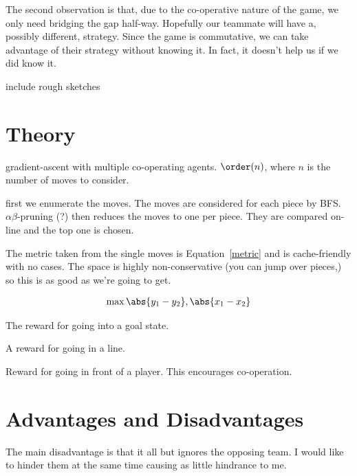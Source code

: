 \documentclass[twocolumn]{article}
\begin{document}
The second observation is that, due to the co-operative nature of the game, we only need bridging the gap half-way. Hopefully our teammate will have a, possibly different, strategy. Since the game is commutative, we can take advantage of their strategy without knowing it. In fact, it doesn't help us if we did know it.

include rough sketches

\section{Theory}


gradient-ascent with multiple co-operating agents.\cite{} $\order(n)$, where $n$ is the number of moves to consider.

first we enumerate the moves. The moves are considered for each piece by BFS. $\alpha\beta$-pruning (?) then reduces the moves to one per piece.\cite{} They are compared on-line and the top one is chosen.

The metric taken from the single moves is Equation~\ref{metric} and is cache-friendly with no cases. The space is highly non-conservative (you can jump over pieces,) so this is as good as we're going to get.

\begin{align}
\max{\abs{y_{1} - y_{2}}, \abs{x_{1} - x_{2}}}\label{metric}
\end{align}

The reward for going into a goal state.

A reward for going in a line.

Reward for going in front of a player. This encourages co-operation.

\section{Advantages and Disadvantages}


The main disadvantage is that it all but ignores the opposing team. I would like to hinder them at the same time causing as little hindrance to me.
\end{document}
